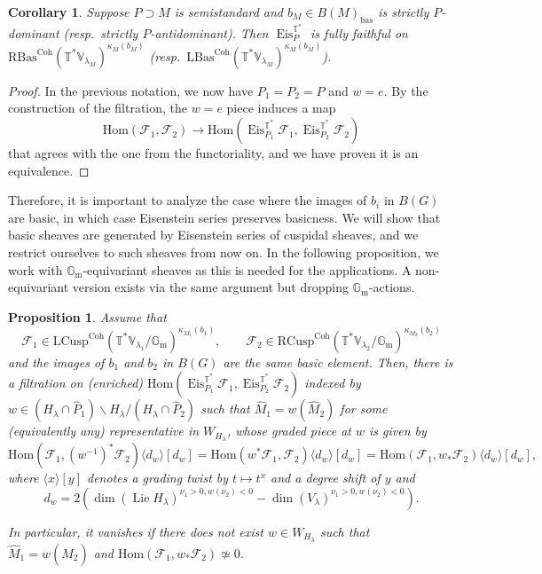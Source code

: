 \documentclass{amsart}
\newtheorem{proposition}[theorem]{Proposition}
\newtheorem{corollary}[theorem]{Corollary}
\theoremstyle{definition}
\theoremstyle{remark}
\numberwithin{equation}{section}
\DeclareMathOperator{\Lie}{Lie}
\newcommand{\mc}{\mathcal}
\newcommand{\bas}{\mathrm{bas}}
\newcommand{\Gm}{{\mathbb{G}_{\mathrm{m}}}}
\newcommand{\Hom}{\mathrm{Hom}}
\newcommand{\wh}{\widehat}
\DeclareMathOperator{\Eis}{\mathrm{Eis}}
\newcommand{\Coh}{\mathrm{Coh}}
\newcommand{\LCusp}{\mathrm{LCusp}}
\newcommand{\RCusp}{\mathrm{RCusp}}
\newcommand{\V}{\mathbb{V}}
\newcommand{\T}{\mathbb{T}}
\newcommand{\RBas}{\mathrm{RBas}}
\newcommand{\LBas}{\mathrm{LBas}}
\begin{document}
\begin{corollary}{\label{cor: fullyfaithfullbas}}
Suppose $P\supset M$ is semistandard and $b_M\in B(M)_{\bas}$ is strictly $P$-dominant (resp.~strictly $P$-antidominant). Then $\Eis^{\T^*}_P$ is fully faithful on $\RBas^\Coh(\T^*\V_{\lambda_M})^{\kappa_M(b_M)}$ (resp.~$\LBas^\Coh(\T^*\V_{\lambda_M})^{\kappa_M(b_M)}$). 
\end{corollary}

\begin{proof}
In the previous notation, we now have $P_1=P_2=P$ and $w=e$. By the construction of the filtration, the $w=e$ piece induces a map
\[
\Hom(\mc F_1, \mc F_2)\to \Hom(\Eis^{\T^*}_{P_1}\mc F_1, \Eis^{\T^*}_{P_2}\mc F_2)
\]
that agrees with the one from the functoriality, and we have proven it is an equivalence. 
\end{proof}

Therefore, it is important to analyze the case where the images of $b_i$ in $B(G)$ are basic, in which case Eisenstein series preserves basicness. We will show that basic sheaves are generated by Eisenstein series of cuspidal sheaves, and we restrict ourselves to such sheaves from now on. In the following proposition, we work with $\Gm$-equivariant sheaves as this is needed for the applications. A non-equivariant version exists via the same argument but dropping $\Gm$-actions.

\begin{proposition}{\label{prop: Gmequivcusphomcomputation}}
Assume that 
\[
\mc F_1\in \LCusp^\Coh(\T^*\V_{\lambda_1} / \Gm)^{\kappa_{M_1}(b_1)}, \qquad \mc F_2\in \RCusp^\Coh(\T^*\V_{\lambda_2}/\Gm)^{\kappa_{M_2}(b_2)}
\]
and the images of $b_1$ and $b_2$ in $B(G)$ are the same basic element. Then, there is a filtration on (enriched) $\Hom(\Eis^{\T^*}_{P_1}\mc F_1, \Eis^{\T^*}_{P_2}\mc F_2)$ indexed by $w\in (H_{\lambda}\cap \wh P_1)\backslash H_\lambda /(H_{\lambda}\cap \wh P_2)$
such that $\wh M_1=w(\wh M_2)$ for some (equivalently any) representative in $W_{H_\lambda}$, whose graded piece at $w$ is given by
\[
\Hom(\mc F_1, (w^{-1})^* \mc F_2)\langle d_w \rangle[d_w]=\Hom(w^*\mc F_1, \mc F_2)\langle d_w \rangle[d_w]=\Hom(\mc F_1, w_*\mc F_2)\langle d_w \rangle[d_w], 
\]
where $\langle x\rangle[y]$ denotes a grading twist by $t\mapsto t^x$ and a degree shift of $y$ and
\begin{equation*}
    d_w = 2( \dim (\Lie H_{\lambda})^{\nu_1 > 0, w(\nu_2)<0}   - \dim (V_{\lambda})^{\nu_1 > 0, w(\nu_2)<0}).
\end{equation*}

In particular, it vanishes if there does not exist $w\in W_{H_\lambda}$ such that $\wh{M}_1=w(\wh{M}_2)$ and $\Hom (\mc F_1, w_*\mc F_2)\not\simeq 0$. 
\end{proposition}
\end{document}
